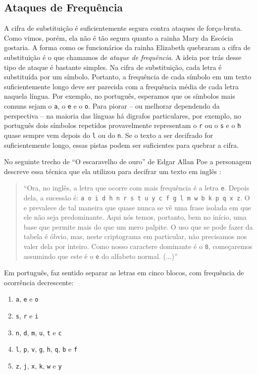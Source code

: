 \subsection{Ataques de Frequência}
\label{sec:frequencia}

A cifra de substituição é suficientemente segura contra ataques de força-bruta.
Como vimos, porém, ela não é tão segura quanto a rainha Mary da Escócia gostaria.
A forma como os funcionários da rainha Elizabeth quebraram a cifra de substituição é o que chamamos de {\em ataque de frequência}.
A ideia por trás desse tipo de ataque é bastante simples.
Na cifra de substituição, cada letra é substituída por um símbolo.
Portanto, a frequência de cada símbolo em um texto suficientemente longo deve ser parecida com a frequência média de cada letra naquela língua.
Por exemplo, no português, esperamos que os símbolos mais comuns sejam o {\tt a}, o {\tt e} e o {\tt o}.
Para piorar -- ou melhorar dependendo da perspectiva -- na maioria das línguas há digrafos particulares, por exemplo, no português dois símbolos repetídos provavelmente representam o {\tt r} ou o {\tt s} e o {\tt h} quase sempre vem depois do {\tt l} ou do {\tt n}.
Se o texto a ser decifrado for suficientemente longo, essas pistas podem ser suficientes para quebrar a cifra.

No seguinte trecho de ``O escaravelho de ouro'' de Edgar Allan Poe a personagem descreve essa técnica que ela utilizou para decifrar um texto em inglês \cite{}:

\begin{quote}
``Ora, no inglês, a letra que ocorre com mais frequência é a letra {\tt e}.
Depois dela, a sucessão é: {\tt a o i d h n r s t u y c f g l m w b k p q x z}.
O e prevalece de tal maneira que quase nunca se vê uma frase isolada em que ele não seja predominante.
Aqui nós temos, portanto, bem no início, uma base que permite mais do que um mero palpite.
O uso que se pode fazer da tabela é óbvio, mas, neste criptograma em particular, não precisamos nos valer dela por inteiro.
Como nosso caractere dominante é o {\tt 8}, começaremos assumindo que este é o {\tt e} do alfabeto normal. (...)''
\end{quote}

Em português, faz sentido separar as letras em cinco blocos, com frequência de ocorrência decrescente:
\begin{enumerate}
\item {\tt a}, {\tt e} e {\tt o}
\item {\tt s}, {\tt r} e {\tt i}
\item {\tt n}, {\tt d}, {\tt m}, {\tt u}, {\tt t} e {\tt c}
\item {\tt l}, {\tt p}, {\tt v}, {\tt g}, {\tt h}, {\tt q}, {\tt b} e {\tt f}
\item {\tt z}, {\tt j}, {\tt x}, {\tt k}, {\tt w} e {\tt y}
\end{enumerate}

